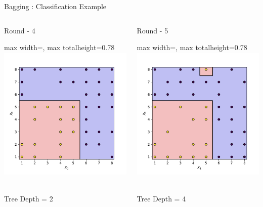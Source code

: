 \documentclass[aspectratio=169,10pt]{beamer}
\newcommand{\fitpic}[1]{\begin{adjustbox}{max width=\linewidth, max totalheight=0.78\textheight}#1\end{adjustbox}}
\begin{document}
\begin{frame}{Bagging : Classification Example}
  \vspace{0.3cm}
  \begin{columns}
    \pause\begin{column}{0.5\textwidth}\centering
      Round - 4\\
      \fitpic{\includegraphics[width=0.9\linewidth]{../assets/ensemble/figures/decision-boundary-3}}\\
      Tree Depth = 2
    \end{column}
    \pause\begin{column}{0.5\textwidth}\centering
      Round - 5\\
      \fitpic{\includegraphics[width=0.9\linewidth]{../assets/ensemble/figures/decision-boundary-4}}\\
      Tree Depth = 4
    \end{column}
  \end{columns}
\end{frame}
\end{document}
